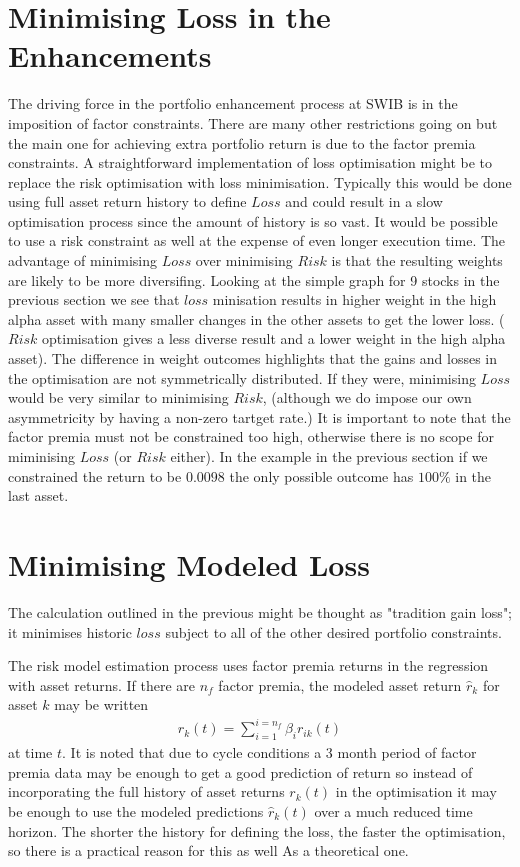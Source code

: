 \documentclass[12pt]{article}
\begin{document}
\section{Minimising Loss in the Enhancements}
The driving force in the portfolio enhancement process at SWIB is in the imposition
of factor constraints. There are many other restrictions going on but the main one for 
achieving extra portfolio return is due to the factor premia constraints. A straightforward 
implementation of loss optimisation might be to replace the risk optimisation with loss minimisation.
Typically this would be done using full asset return history to define $Loss$ and could 
result in a slow optimisation process since the amount of history is so vast. It would be possible 
to use a risk constraint as well at the expense of even longer execution time. The advantage of
minimising $Loss$ over minimising $Risk$ is that the resulting weights are likely
to be more diversifing. Looking at the simple graph for 9 stocks in the previous section we see that
$loss$ minisation results in higher weight in the high alpha asset with many 
smaller changes in the other assets to get the lower loss. ($Risk$ optimisation gives a less diverse
result and a lower weight in the high alpha asset). The difference in weight outcomes
highlights that the gains and losses in the optimisation are not symmetrically
distributed. If they were, minimising $Loss$ would be very similar to minimising $Risk$, (although
we do impose our own asymmetricity by having a non-zero tartget rate.) It is important
to note that the factor premia must not be constrained too high, otherwise there is no scope 
for miminising $Loss$ (or $Risk$ either). In the example in the previous section 
if we constrained the return to be $0.0098$ the only possible outcome has $100\%$ in 
the last asset.
\section{Minimising Modeled Loss}
The calculation outlined in the previous might be thought as "tradition gain loss"; it
minimises historic $loss$ subject to all of the other desired portfolio constraints.

The risk model estimation process uses factor premia returns in the regression
with asset returns. If there are $n_f$ factor premia, the modeled asset return $\hat{r}_{k}$ for asset $k$ may be written
\begin{eqnarray}
    \hat{r}_{k}(t) = \sum_{i=1}^{i=n_f}\beta_{i} r_{ik}(t)
\end{eqnarray}
at time $t$.
It is noted that due to cycle conditions a 3 month period of factor premia data may be enough
to get a good prediction of return so instead of incorporating the full history of
asset returns $r_k(t)$ in the optimisation it may be enough to use the modeled predictions
$\hat{r}_{k}(t)$ over a much reduced time horizon. The shorter the history for defining the
loss, the faster the optimisation, so there is a practical reason for this as well As
a theoretical one.
\end{document}
